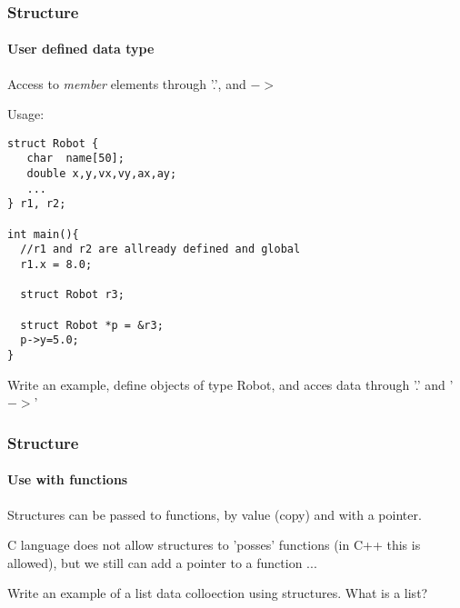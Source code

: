 \documentclass[10pt]{beamer}
\begin{document}
\begin{frame}[fragile]
  \frametitle{Structure}
  \framesubtitle{User defined data type}  

Access to \textit{member} elements through '.', and $->$

\vspace{0.2cm}
Usage:\vspace{0.1cm}
\begin{lstlisting}
struct Robot {
   char  name[50];
   double x,y,vx,vy,ax,ay;
   ...
} r1, r2;

int main(){
  //r1 and r2 are allready defined and global
  r1.x = 8.0;
  
  struct Robot r3;
  
  struct Robot *p = &r3;
  p->y=5.0;
}

\end{lstlisting}

Write an example, define objects of type Robot, and acces data through '.' and '$->$'

\end{frame}

\begin{frame}[fragile]
  \frametitle{Structure}
  \framesubtitle{Use with functions}  

  Structures can be passed to functions, by value (copy) and with a pointer.
  \vspace{1cm}
  
  C language does not allow structures to 'posses' functions (in C++ this is allowed),
  but we still can add a pointer to a function ...
  \vspace{1cm}
  
  Write an example of a list data colloection using structures. What is a list?
\end{frame}
\end{document}
